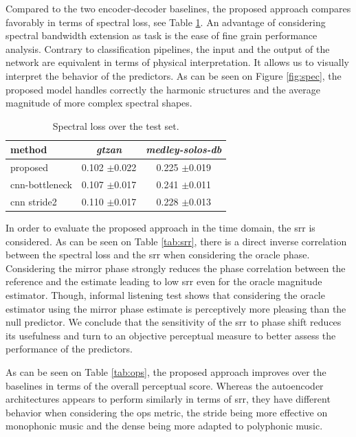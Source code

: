 \documentclass{article}
\begin{document}
Compared to the two encoder-decoder baselines, the proposed approach compares favorably in terms of spectral loss, see Table \ref{tab:loss}. An advantage of considering spectral bandwidth extension as task is the ease of fine grain performance analysis. Contrary to classification pipelines, the input and the output of the network are equivalent in terms of physical interpretation. It allows us to visually interpret the behavior of the predictors. As can be seen on Figure \ref{fig:spec}, the proposed model handles correctly the harmonic structures and the average magnitude of more complex spectral shapes.

\begin{table}[t]
  \caption{Spectral loss over the test set.}
  \label{tab:loss}
  \begin{center}
\begin{tabular}{lcc}
method & \textit{gtzan} & \textit{medley-solos-db} \\
\hline
proposed & 0.102 $\pm$0.022 & 0.225 $\pm$0.019 \\
cnn-bottleneck & 0.107 $\pm$0.017 & 0.241 $\pm$0.011 \\
cnn stride2 & 0.110 $\pm$0.017 & 0.228 $\pm$0.013 \\
\end{tabular}
\end{center}
\vspace{-4mm}
\end{table}

In order to evaluate the proposed approach in the time domain, the srr is considered. As can be seen on Table \ref{tab:srr}, there is a direct inverse correlation between the spectral loss and the srr when considering the oracle phase. Considering the mirror phase strongly reduces the phase correlation between the reference and the estimate leading to low srr even for the oracle magnitude estimator. Though, informal listening test shows that considering the oracle estimator using the mirror phase estimate is perceptively more pleasing than the null predictor. We conclude that the sensitivity of the srr to phase shift reduces its usefulness and turn to an objective perceptual measure to better assess the performance of the predictors.

As can be seen on Table \ref{tab:ops}, the proposed approach improves over the baselines in terms of the overall perceptual score. Whereas the autoencoder architectures appears to perform similarly in terms of srr, they have different behavior when considering the ops metric, the stride being more effective on monophonic music and the dense being more adapted to polyphonic music.
\end{document}
